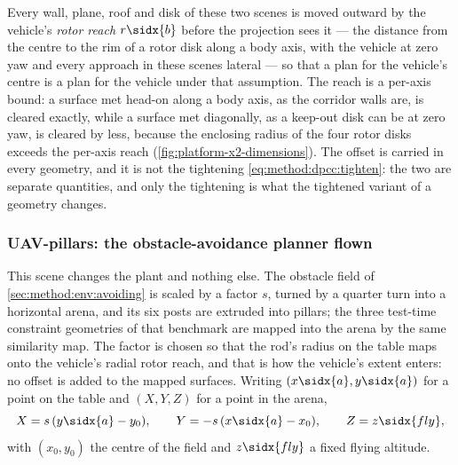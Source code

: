 Every wall, plane, roof and disk of these two scenes is moved outward by the vehicle's \emph{rotor
reach} $r\sidx{b}$ before the projection sees it --- the distance from the centre to the rim of a rotor
disk along a body axis, with the vehicle at zero yaw and every approach in these scenes lateral --- so
that a plan for the vehicle's centre is a plan for the vehicle under that assumption. The reach is a per-axis
bound: a surface met head-on along a body axis, as the corridor walls are, is cleared exactly, while a surface
met diagonally, as a keep-out disk can be at zero yaw, is cleared by less, because the enclosing radius of the
four rotor disks exceeds the per-axis reach (\autoref{fig:platform-x2-dimensions}). The offset is
carried in every geometry, and it is not the tightening \eqref{eq:method:dpcc:tighten}: the two are
separate quantities, and only the tightening is what the tightened variant of a geometry changes.

\subsubsection*{UAV-pillars: the obstacle-avoidance planner flown}

This scene changes the plant and nothing else. The obstacle field of \autoref{sec:method:env:avoiding}
is scaled by a factor $s$, turned by a quarter turn into a horizontal arena, and its six posts are
extruded into pillars; the three test-time constraint geometries of that benchmark are mapped into the
arena by the same similarity map. The factor is chosen so that the rod's radius on the table maps onto
the vehicle's radial rotor reach, and that is how the vehicle's extent enters: no offset is added to the
mapped surfaces. Writing $(x\sidx{a},y\sidx{a})$ for a point on the table and $(X,Y,Z)$ for a point in
the arena,
\begin{equation}\label{eq:method:env:pillarsmap}
  X = s\,(y\sidx{a}-y_{0}),
  \qquad
  Y = -s\,(x\sidx{a}-x_{0}),
  \qquad
  Z = z\sidx{fly},
\end{equation}
with $(x_{0},y_{0})$ the centre of the field and $z\sidx{fly}$ a fixed flying altitude.

